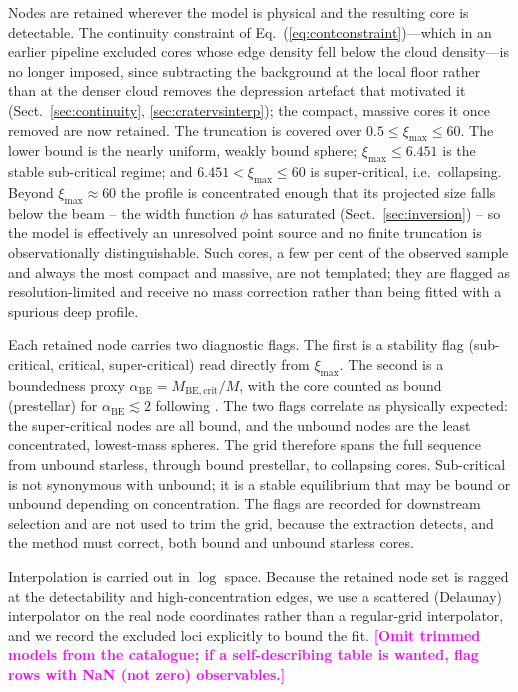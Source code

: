 \documentclass[11pt,a4paper]{article}
\newcommand{\note}[1]{\textcolor{magenta}{\textbf{[#1]}}}
\newcommand{\ximax}{\xi_{\mathrm{max}}}
\begin{document}
Nodes are retained wherever the model is physical and the resulting core is
detectable. The continuity constraint of
Eq.~(\ref{eq:contconstraint})---which in an earlier pipeline excluded cores
whose edge density fell below the cloud density---is no longer imposed, since
subtracting the background at the local floor rather than at the denser cloud
removes the depression artefact that motivated it (Sect.~\ref{sec:continuity},
\ref{sec:cratervsinterp}); the compact, massive cores it once removed are now
retained. The truncation is covered over $0.5\le\ximax\le60$. The lower bound
is the nearly uniform, weakly bound sphere; $\ximax\le6.451$ is the stable
sub-critical regime; and $6.451<\ximax\le60$ is super-critical, i.e.\
collapsing. Beyond $\ximax\approx60$ the profile is concentrated enough that its
projected size falls below the beam -- the width function $\phi$ has saturated
(Sect.~\ref{sec:inversion}) -- so the model is effectively an unresolved point
source and no finite truncation is observationally distinguishable. Such cores,
a few per cent of the observed sample and always the most compact and massive,
are not templated; they are flagged as resolution-limited and receive no mass
correction rather than being fitted with a spurious deep profile.

Each retained node carries two diagnostic flags. The first is a stability flag
(sub-critical, critical, super-critical) read directly from $\ximax$. The second
is a boundedness proxy $\alpha_{\mathrm{BE}}=M_{\mathrm{BE,crit}}/M$, with the
core counted as bound (prestellar) for $\alpha_{\mathrm{BE}}\lesssim2$ following
\citet{Konyves+2015}. The two flags correlate as physically expected: the
super-critical nodes are all bound, and the unbound nodes are the least
concentrated, lowest-mass spheres. The grid therefore spans the full sequence
from unbound starless, through bound prestellar, to collapsing cores.
Sub-critical is not synonymous with unbound; it is a stable equilibrium that may
be bound or unbound depending on concentration. The flags are recorded for
downstream selection and are not used to trim the grid, because the extraction
detects, and the method must correct, both bound and unbound starless cores.

Interpolation is carried out in $\log$ space. Because the retained node set is
ragged at the detectability and high-concentration edges, we use a scattered
(Delaunay) interpolator on the real node coordinates rather than a regular-grid
interpolator, and we record the excluded loci explicitly to bound the fit.
\note{Omit trimmed models from the catalogue; if a self-describing table is
wanted, flag rows with NaN (not zero) observables.}
\end{document}
